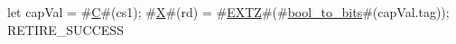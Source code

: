 let capVal = #\hyperref[sailRISCVzC]{C}#(cs1);
#\hyperref[sailRISCVzX]{X}#(rd) = #\hyperref[sailRISCVzEXTZ]{EXTZ}#(#\hyperref[sailRISCVzboolzytozybits]{bool\_to\_bits}#(capVal.tag));
RETIRE_SUCCESS
